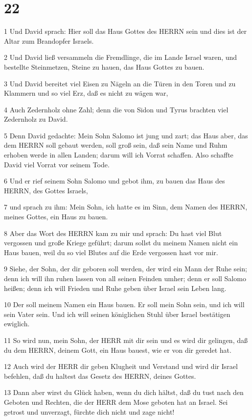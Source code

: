 \chapter{22}

\par 1 Und David sprach: Hier soll das Haus Gottes des HERRN sein und dies ist der Altar zum Brandopfer Israels.
\par 2 Und David ließ versammeln die Fremdlinge, die im Lande Israel waren, und bestellte Steinmetzen, Steine zu hauen, das Haus Gottes zu bauen.
\par 3 Und David bereitet viel Eisen zu Nägeln an die Türen in den Toren und zu Klammern und so viel Erz, daß es nicht zu wägen war,
\par 4 Auch Zedernholz ohne Zahl; denn die von Sidon und Tyrus brachten viel Zedernholz zu David.
\par 5 Denn David gedachte: Mein Sohn Salomo ist jung und zart; das Haus aber, das dem HERRN soll gebaut werden, soll groß sein, daß sein Name und Ruhm erhoben werde in allen Landen; darum will ich Vorrat schaffen. Also schaffte David viel Vorrat vor seinem Tode.
\par 6 Und er rief seinem Sohn Salomo und gebot ihm, zu bauen das Haus des HERRN, des Gottes Israels,
\par 7 und sprach zu ihm: Mein Sohn, ich hatte es im Sinn, dem Namen des HERRN, meines Gottes, ein Haus zu bauen.
\par 8 Aber das Wort des HERRN kam zu mir und sprach: Du hast viel Blut vergossen und große Kriege geführt; darum sollst du meinem Namen nicht ein Haus bauen, weil du so viel Blutes auf die Erde vergossen hast vor mir.
\par 9 Siehe, der Sohn, der dir geboren soll werden, der wird ein Mann der Ruhe sein; denn ich will ihn ruhen lassen von all seinen Feinden umher; denn er soll Salomo heißen; denn ich will Frieden und Ruhe geben über Israel sein Leben lang.
\par 10 Der soll meinem Namen ein Haus bauen. Er soll mein Sohn sein, und ich will sein Vater sein. Und ich will seinen königlichen Stuhl über Israel bestätigen ewiglich.
\par 11 So wird nun, mein Sohn, der HERR mit dir sein und es wird dir gelingen, daß du dem HERRN, deinem Gott, ein Haus bauest, wie er von dir geredet hat.
\par 12 Auch wird der HERR dir geben Klugheit und Verstand und wird dir Israel befehlen, daß du haltest das Gesetz des HERRN, deines Gottes.
\par 13 Dann aber wirst du Glück haben, wenn du dich hältst, daß du tust nach den Geboten und Rechten, die der HERR dem Mose geboten hat an Israel. Sei getrost und unverzagt, fürchte dich nicht und zage nicht!
